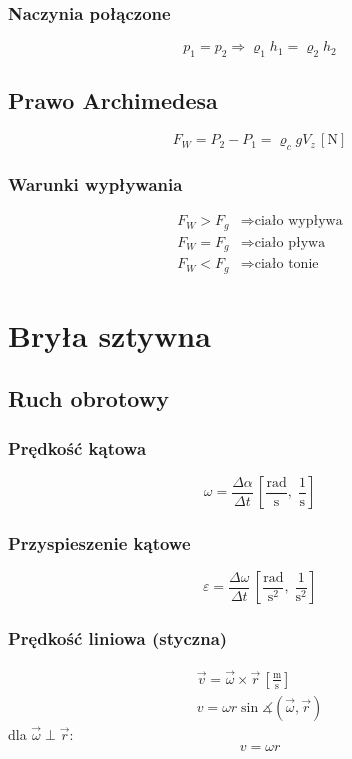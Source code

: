 \documentclass{article}
\numberwithin{equation}{section}
\newcommand{\unit}[1]{\, \left[\mathrm{#1}\right]}
\begin{document}
      \subsubsection{Naczynia połączone}
        \begin{equation}
          p_1 = p_2 \Rightarrow \varrho_1h_1 = \varrho_2h_2
        \end{equation}
    \subsection{Prawo Archimedesa}
      \begin{equation}
        F_W = P_2 - P_1 = \varrho_cgV_z \unit{N}
      \end{equation}
      \subsubsection{Warunki wypływania}
        \begin{align*}
          F_W > F_g &\Rightarrow \text{ciało wypływa}\\
          F_W = F_g &\Rightarrow \text{ciało pływa}\\
          F_W < F_g &\Rightarrow \text{ciało tonie}
        \end{align*}

  \newpage
  \section{Bryła sztywna}
    \subsection{Ruch obrotowy}
      \subsubsection{Prędkość kątowa}
        \begin{equation}
          \omega = \frac{\Delta\alpha}{\Delta t} \unit{\frac{rad}{s},\;\frac{1}{s}}
        \end{equation}
      \subsubsection{Przyspieszenie kątowe}
        \begin{equation}
          \varepsilon = \frac{\Delta\omega}{\Delta t} \unit{\frac{rad}{s^2},\;\frac{1}{s^2}}
        \end{equation}
      \subsubsection{Prędkość liniowa (styczna)}
        \begin{gather}
          \vec v = \vec\omega \times \vec r\unit{\frac{m}{s}}\\
          v = \omega r\sin\measuredangle (\vec\omega, \vec r)
        \end{gather}
        dla $\vec\omega \perp \vec r$:
        \begin{equation}
          v =\omega r
        \end{equation}
\end{document}
